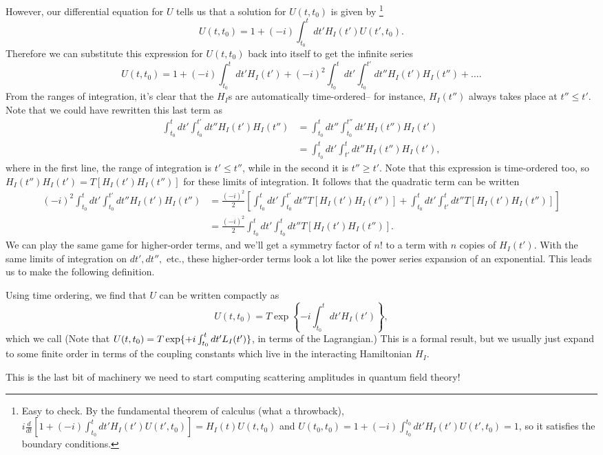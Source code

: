 However, our differential equation for $U$ tells us that a solution for $U(t,t_0)$ is given by%
    \footnote{Easy to check. By the fundamental theorem of calculus (what a throwback), $i\frac{d}{dt}\left[1+(-i)\int_{t_0}^t dt' H_I(t')U(t',t_0)\right] =H_I(t)U(t,t_0)$ and $U(t_0,t_0)=1+(-i)\int_{t_0}^{t_0} dt' H_I(t')U(t',t_0)=1$, so it satisfies the boundary conditions.
    }
$$U(t,t_0)=1+(-i)\int_{t_0}^t dt' H_I(t')U(t',t_0).$$
%
Therefore we can substitute this expression for $U(t,t_0)$ back into itself to get the infinite series
$$U(t,t_0)=1+(-i)\int_{t_0}^t dt' H_I(t')+(-i)^2 \int_{t_0}^t dt' \int_{t_0}^{t'} dt'' H_I(t')H_I(t'')+\ldots.$$
From the ranges of integration, it's clear that the $H_I$s are automatically time-ordered-- for instance, $H_I(t'')$ always takes place at $t''\leq t'$. Note that we could have rewritten this last term as
\begin{align*}
    \int_{t_0}^t dt' \int_{t_0}^{t'} dt'' H_I(t')H_I(t'') &=
        \int_{t_0}^t dt'' \int_{t_0}^{t''} dt' H_I(t'')H_I(t')\\
    &=\int_{t_0}^t dt' \int_{t'}^t dt'' H_I(t'')H_I(t'),
\end{align*}
where in the first line, the range of integration is $t'\leq t''$, while in the second it is $t'' \geq t'$. Note that this expression is time-ordered too, so $H_I(t'')H_I(t')=T[H_I(t')H_I(t'')]$ for these limits of integration. It follows that the quadratic term can be written
\begin{align*}
    (-i)^2\int_{t_0}^t dt' \int_{t_0}^{t'} dt'' H_I(t')H_I(t'') &=
        \frac{(-i)^2}{2}\left[\int_{t_0}^t dt' \int_{t_0}^{t'} dt'' T[H_I(t')H_I(t'')]
        +\int_{t_0}^t dt' \int_{t'}^t dt'' T[H_I(t')H_I(t'')]\right]\\
    &=\frac{(-i)^2}{2} \int_{t_0}^t dt' \int_{t_0}^t dt'' T[H_I(t') H_I(t'')].
\end{align*}%
We can play the same game for higher-order terms, and we'll get a symmetry factor of $n!$ to a term with $n$ copies of $H_I(t')$. With the same limits of integration on $dt',dt'',$ etc., these higher-order terms look a lot like the power series expansion of an exponential. This leads us to make the following definition.
\begin{defn}
Using time ordering, we find that $U$ can be written compactly as
$$U(t,t_0)=T \exp \left\{-i\int_{t_0}^t dt' H_I(t')\right\},$$
which we call  (Note that $U(t,t_0)=T \exp \{+i\int_{t_0}^t dt' L_I(t')\}$, in terms of the Lagrangian.) This is a formal result, but we usually just expand to some finite order in terms of the coupling constants which live in the interacting Hamiltonian $H_I$.
\end{defn}
This is the last bit of machinery we need to start computing scattering amplitudes in quantum field theory!

